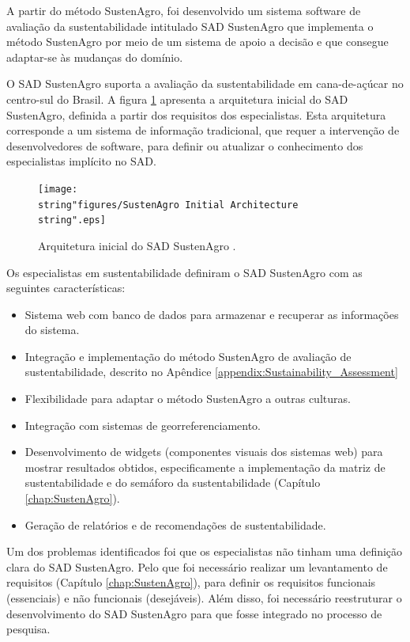 A partir do método SustenAgro, foi desenvolvido um sistema software
de avaliação da sustentabilidade intitulado SAD SustenAgro que implementa
o método SustenAgro por meio de um sistema de apoio a decisão e que
consegue adaptar-se às mudanças do domínio.

O SAD SustenAgro suporta a avaliação da sustentabilidade em cana-de-açúcar
no centro-sul do Brasil. A figura \ref{fig:SustenAgro-arquitetura-inicial}
apresenta a arquitetura inicial do SAD SustenAgro, definida a partir
dos requisitos dos especialistas. Esta arquitetura corresponde a um
sistema de informação tradicional, que requer a intervenção de desenvolvedores
de software, para definir ou atualizar o conhecimento dos especialistas
implícito no SAD.

\begin{figure}[H]
\begin{centering}
\texttt{[image: \\string"figures/SustenAgro Initial Architecture\\string".eps]}
\par\end{centering}
\caption{Arquitetura inicial do SAD SustenAgro .\label{fig:SustenAgro-arquitetura-inicial}}
\end{figure}

Os especialistas em sustentabilidade definiram o SAD SustenAgro com
as seguintes características:
\begin{itemize}
\item Sistema web com banco de dados para armazenar e recuperar as informações
do sistema.
\item Integração e implementação do método SustenAgro de avaliação de sustentabilidade,
descrito no Apêndice \ref{appendix:Sustainability_Assessment} 
\item Flexibilidade para adaptar o método SustenAgro a outras culturas.
\item Integração com sistemas de georreferenciamento.
\item Desenvolvimento de \foreignlanguage{english}{widgets} (componentes
visuais dos sistemas web) para mostrar resultados obtidos, especificamente
a implementação da matriz de sustentabilidade e do semáforo da sustentabilidade
(Capítulo \ref{chap:SustenAgro}).
\item Geração de relatórios e de recomendações de sustentabilidade.
\end{itemize}
Um dos problemas identificados foi que os especialistas não tinham
uma definição clara do SAD SustenAgro. Pelo que foi necessário realizar
um levantamento de requisitos (Capítulo \ref{chap:SustenAgro}), para
definir os requisitos funcionais (essenciais) e não funcionais (desejáveis).
Além disso, foi necessário reestruturar o desenvolvimento do SAD SustenAgro
para que fosse integrado no processo de pesquisa.

